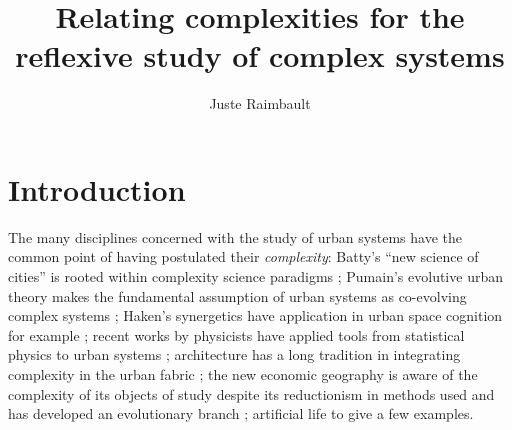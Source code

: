 

\title*{Relating complexities for the reflexive study of complex systems}
\author{Juste Raimbault}
%
%
\maketitle







\section{Introduction}


The many disciplines concerned with the study of urban systems have the common point of having postulated their \emph{complexity}: Batty's ``new science of cities'' is rooted within complexity science paradigms \cite{batty2007cities,batty2013new}; Pumain's evolutive urban theory makes the fundamental assumption of urban systems as co-evolving complex systems \cite{pumain2017geography,pumain1997pour}; Haken's synergetics have application in urban space cognition for example \cite{e18060197}; recent works by physicists have applied tools from statistical physics to urban systems \cite{west2017scale}; architecture has a long tradition in integrating complexity in the urban fabric \cite{alexander1977pattern}; the new economic geography is aware of the complexity of its objects of study despite its reductionism in methods used \cite{krugman1994complex} and has developed an evolutionary branch \cite{cooke2018evolutionary}; artificial life  to give a few examples.

